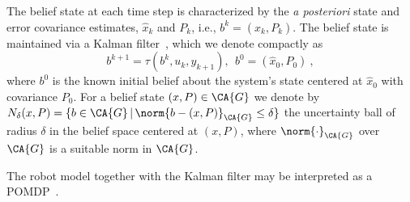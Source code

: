 The belief state at each time step is characterized by
the {\it a posteriori} state and error covariance estimates, $\hat{x}_k$ and
$P_k$, i.e.,
$b^k = (\hat{x}_k, P_k)$. The belief state  is maintained via
a Kalman filter~\cite{Bertsekas2012}, which we denote compactly as 
%
\begin{equation}
\label{eq:kf-compact}
b^{k+1} = \tau(b^k, u_k, y_{k+1}),\ \ b^0 = (\hat{x}_0, P_0)\:,
\end{equation}
%
where $b^0$
is the known initial belief about the system's state
centered at $\hat{x}_0$ with covariance $P_0$.
For a belief state $(x, P) \in \CA{G}$ 
we denote by $N_\delta(x, P) = \{ b \in \CA{G} \,|\, \norm{b - (x, P)}_\CA{G} \leq \delta \}$ the uncertainty ball of radius $\delta$ in the belief space centered at $(x, P)$, where $\norm{\cdot}_\CA{G}$ over $\CA{G}$ is a suitable norm in $\CA{G}$.

The robot model together with the Kalman filter may be
interpreted as a POMDP~\cite{Kaelbling98,puterman2014,Pineau03a}.


